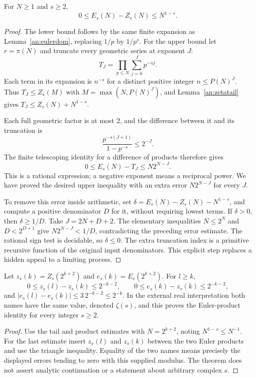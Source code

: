 \begin{theorem}\label{an:eulererror}
For $N\ge1$ and $s\ge2$,
\[
 0\le E_s(N)-Z_s(N)\le N^{1-s}.
\]
\end{theorem}
\begin{proof}
The lower bound follows by the same finite expansion as Lemma~\ref{an:eulerdom}, replacing $1/p$ by $1/p^s$. For the upper bound let $r=\pi(N)$ and truncate every geometric series at exponent $J$:
\[
 T_J=\prod_{p\le N}\sum_{j=0}^Jp^{-sj}.
\]
Each term in its expansion is $n^{-s}$ for a distinct positive integer $n\le P(N)^J$. Thus $T_J\le Z_s(M)$ with $M=\max(N,P(N)^J)$, and Lemma~\ref{an:zetatail} gives $T_J\le Z_s(N)+N^{1-s}$.

Each full geometric factor is at most $2$, and the difference between it and its truncation is
\[
 \frac{p^{-s(J+1)}}{1-p^{-s}}\le2^{-J}.
\]
The finite telescoping identity for a difference of products therefore gives
\[
 0\le E_s(N)-T_J\le N2^{N-J}.
\]
This is a rational expression; a negative exponent means a reciprocal power. We have proved the desired upper inequality with an extra error $N2^{N-J}$ for every $J$.

To remove this error inside arithmetic, set $\delta=E_s(N)-Z_s(N)-N^{1-s}$, and compute a positive denominator $D$ for it, without requiring lowest terms. If $\delta>0$, then $\delta\ge1/D$. Take $J=2N+D+2$. The elementary inequalities $N\le2^N$ and $D<2^{D+1}$ give $N2^{N-J}<1/D$, contradicting the preceding error estimate. The rational sign test is decidable, so $\delta\le0$. The extra truncation index is a primitive recursive function of the original input denominators. This explicit step replaces a hidden appeal to a limiting process.
\end{proof}

\begin{corollary}\label{an:zetaname}
Let $z_s(k)=Z_s(2^{k+2})$ and $e_s(k)=E_s(2^{k+2})$. For $l\ge k$,
\[
 0\le z_s(l)-z_s(k)\le2^{-k-2},\qquad
 0\le e_s(k)-z_s(k)\le2^{-k-2},
\]
and $|e_s(l)-e_s(k)|\le3\,2^{-k-2}\le2^{-k}$. In the external real interpretation both names have the same value, denoted $\zeta(s)$, and this proves the Euler-product identity for every integer $s\ge2$.
\end{corollary}
\begin{proof}
Use the tail and product estimates with $N=2^{k+2}$, noting $N^{1-s}\le N^{-1}$. For the last estimate insert $z_s(l)$ and $z_s(k)$ between the two Euler products and use the triangle inequality. Equality of the two names means precisely the displayed errors tending to zero with this supplied modulus. The theorem does not assert analytic continuation or a statement about arbitrary complex $s$.
\end{proof}

